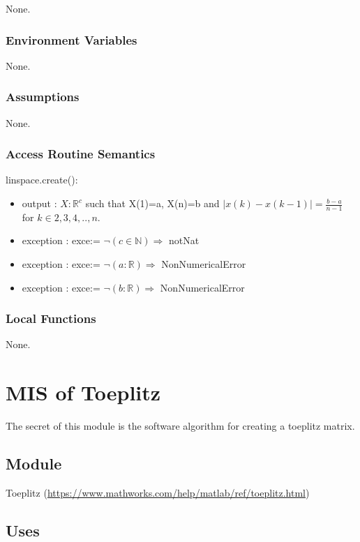 \documentclass[12pt, titlepage]{article}
\begin{document}
None.

\subsubsection{Environment Variables}

None.

\subsubsection{Assumptions}

None.

\subsubsection{Access Routine Semantics}

\noindent linspace.create():
\begin{itemize}
	\item output : $X : \mathbb{R}^{c}$ such that X(1)=a, X(n)=b and 
	$|x(k)-x(k-1)|=\frac{b-a}{n-1}$ for $k \in {2,3,4,..,n}$. 
	\item exception : exce:= $\neg(c \in \mathbb{N}) \Rightarrow$ 
	notNat
	\item exception : exce:= $\neg(a: \mathbb{R}) \Rightarrow$ 
	NonNumericalError 
	\item exception : exce:= $\neg(b: \mathbb{R}) \Rightarrow$ NonNumericalError
\end{itemize}

\subsubsection{Local Functions} 

None. 

\newpage 

\section{MIS of Toeplitz} \label{TOE}

The secret of this module is the software algorithm for creating a toeplitz 
matrix.

\subsection{Module}

Toeplitz (\url{https://www.mathworks.com/help/matlab/ref/toeplitz.html})

\subsection{Uses}
\end{document}
